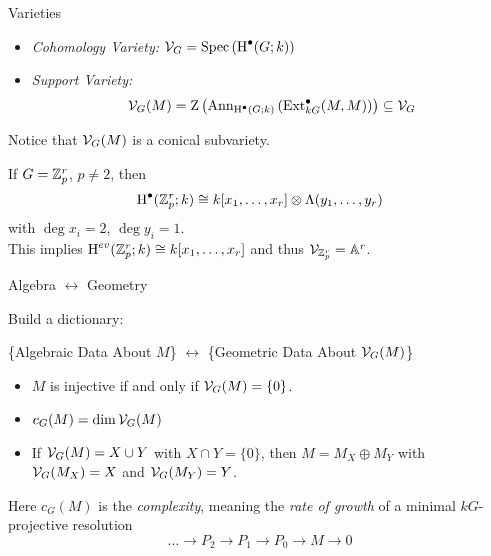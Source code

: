 \documentclass{beamer}
\begin{document}
  \begin{frame}{Varieties}
    \pause
    \begin{definition}
      \begin{itemize}
        \item \emph{Cohomology Variety:} $\mathcal{V}_G = \operatorname{Spec}\left(\operatorname{H}^\bullet(G;k)\right)$\pause
        \item \emph{Support Variety:}
          \[
            \mathcal{V}_G(M) = \operatorname{Z}\left(\operatorname{Ann}_{\operatorname{H}^\bullet(G;k)}\left(\operatorname{Ext}_{kG}^\bullet(M,M)\right)\right) \subseteq \mathcal{V}_G
          \]
        \end{itemize}
      \end{definition}\pause
      Notice that $\mathcal{V}_G(M)$ is a conical subvariety.
      \begin{example}\pause
        If $G = \mathbb{Z}_p^r$, $p \neq 2$, then \[\operatorname{H}^\bullet(\mathbb{Z}_p^r;k) \cong k[x_1,\ldots,x_r] \otimes \Lambda(y_1,\ldots,y_r)\] with $\deg x_i = 2$, $\deg y_i = 1$. \\
        This implies $\operatorname{H}^{ev}(\mathbb{Z}_p^r;k) \cong k[x_1,\ldots,x_r]$ and thus $\mathcal{V}_{\mathbb{Z}_p^r} = \mathbb{A}^r$.
      \end{example}
    \end{frame}

    \begin{frame}{Algebra $\leftrightarrow$ Geometry}
      \pause
      \begin{idea}
        Build a dictionary:
        \begin{center}
          \{Algebraic Data About $M$\} $\leftrightarrow$ \{Geometric Data About $\mathcal{V}_G(M)$\}
        \end{center}
      \end{idea}
      \begin{theorem}
        \begin{itemize}
        \item $M$ is injective if and only if $\mathcal{V}_G(M) = \{0\}$.\pause
        \item $c_G(M) = \dim \mathcal{V}_G(M)$\pause
        \item If $\mathcal{V}_G(M) = X \cup Y$ with $X \cap Y = \{0\}$, then $M = M_X \oplus M_Y$ with $\mathcal{V}_G(M_X) = X$ and $\mathcal{V}_G(M_Y) = Y$.\pause
        \end{itemize}
      \end{theorem}
      \pause Here $c_G(M)$ is the \emph{complexity}, meaning the \emph{rate of growth} of a minimal $kG$-projective resolution
      \[
        \ldots \to P_2 \to P_1 \to P_0 \to M \to 0
      \]
    \end{frame}
\end{document}
